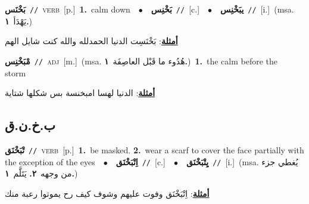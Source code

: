 \documentclass[10pt,a4paper,twoside]{article} %
\begin{document}
\begin{multicols}{2}
{\setlength\topsep{0pt}\textbf{\foreignlanguage{arabic}{بَخْنَس}}\ {\color{gray}\texttt{//}\color{black}}\ \textsc{verb}\ [p.]\ \textbf{1.}~calm down\ \ $\bullet$\ \ \setlength\topsep{0pt}\textbf{\foreignlanguage{arabic}{بَخْنِس}}\ {\color{gray}\texttt{//}\color{black}}\ [c.]\ \ $\bullet$\ \ \setlength\topsep{0pt}\textbf{\foreignlanguage{arabic}{يبَخْنِس}}\ {\color{gray}\texttt{//}\color{black}}\ [i.]\ \color{gray}(msa. \foreignlanguage{arabic}{يَهْدَأ}~\foreignlanguage{arabic}{\textbf{١.}})\color{black}\  \begin{flushright}\color{gray}\foreignlanguage{arabic}{\textbf{\underline{\foreignlanguage{arabic}{أمثلة}}}: بَخْنَسِت الدنيا الحمدلله والله كنت شايل الهم}\end{flushright}\color{black}} \vspace{2mm}

{\setlength\topsep{0pt}\textbf{\foreignlanguage{arabic}{مْبَخْنِس}}\ {\color{gray}\texttt{//}\color{black}}\ \textsc{adj}\ [m.]\ \color{gray}(msa. \foreignlanguage{arabic}{هُدُوء ما قَبْل العاصِفَة}~\foreignlanguage{arabic}{\textbf{١.}})\color{black}\ \textbf{1.}~the calm before the storm\  \begin{flushright}\color{gray}\foreignlanguage{arabic}{\textbf{\underline{\foreignlanguage{arabic}{أمثلة}}}: الدنيا لهسا امبخنسة بس شكلها شتاية}\end{flushright}\color{black}} \vspace{2mm}

\vspace{-3mm}
\subsection*{\color{blue}\foreignlanguage{arabic}{ب.خ.ن.ق}\color{blue}{}} 

{\setlength\topsep{0pt}\textbf{\foreignlanguage{arabic}{تْبَخْنَق}}\ {\color{gray}\texttt{//}\color{black}}\ \textsc{verb}\ [p.]\ \textbf{1.}~be masked.  \textbf{2.}~wear a scarf to cover the face partially with the exception of the eyes\ \ $\bullet$\ \ \setlength\topsep{0pt}\textbf{\foreignlanguage{arabic}{اِتْبَخْنَق}}\ {\color{gray}\texttt{//}\color{black}}\ [c.]\ \ $\bullet$\ \ \setlength\topsep{0pt}\textbf{\foreignlanguage{arabic}{يِتْبَخْنَق}}\ {\color{gray}\texttt{//}\color{black}}\ [i.]\ \color{gray}(msa. \foreignlanguage{arabic}{يُغطي جزء من وجهه}~\foreignlanguage{arabic}{\textbf{٢.}}  \foreignlanguage{arabic}{يَتَلَّم}~\foreignlanguage{arabic}{\textbf{١.}})\color{black}\  \begin{flushright}\color{gray}\foreignlanguage{arabic}{\textbf{\underline{\foreignlanguage{arabic}{أمثلة}}}: اِتْبَخْنَق وفوت عليهم وشوف كيف رح يموتوا رعبة منك}\end{flushright}\color{black}} \vspace{2mm}


\end{multicols}
\end{document}
